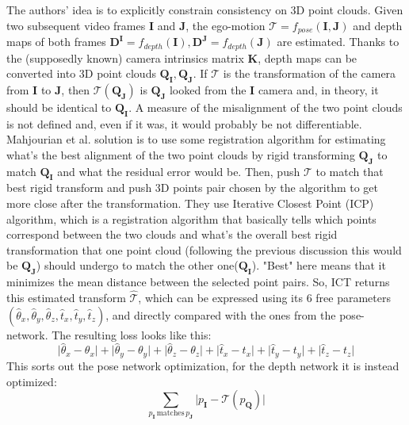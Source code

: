 The authors' idea is to explicitly constrain consistency on 3D point clouds.
Given two subsequent video frames $\mathbf{I}$ and $\mathbf{J}$, the ego-motion $\mathcal{T} = f_{pose}(\mathbf{I}, \mathbf{J})$ and depth maps of both frames $\mathbf{D}^{\mathbf{I}} = f_{depth}(\mathbf{I}), \mathbf{D}^{\mathbf{J}} = f_{depth}(\mathbf{J})$ are estimated.
Thanks to the (supposedly known) camera intrinsics matrix $\mathbf{K}$, depth maps can be converted into 3D point clouds $\mathbf{Q}_{\mathbf{I}}, \mathbf{Q}_{\mathbf{J}}$.
If $\mathcal{T}$ is the transformation of the camera from $\mathbf{I}$ to $\mathbf{J}$, then $\mathcal{T} ( \mathbf{Q}_{\mathbf{J}} )$ is $\mathbf{Q}_{\mathbf{J}}$ looked from the $\mathbf{I}$ camera and, in theory, it should be identical to $\mathbf{Q}_{\mathbf{I}}$.
A measure of the misalignment of the two point clouds is not defined and, even if it was, it would probably be not differentiable.
Mahjourian et al. solution is to use some registration algorithm for estimating what's the best alignment of the two point clouds by rigid transforming $\mathbf{Q}_{\mathbf{J}}$ to match $\mathbf{Q}_{\mathbf{I}}$ and what the residual error would be.
Then, push $\mathcal{T}$ to match that best rigid transform and push 3D points pair chosen by the algorithm to get more close after the transformation.
They use Iterative Closest Point (ICP) algorithm, which is a registration algorithm that basically tells which points correspond between the two clouds and what's the overall best rigid transformation that one point cloud (following the previous discussion this would be $\mathbf{Q}_{\mathbf{J}}$) should undergo to match the other one($\mathbf{Q}_{\mathbf{I}}$).
"Best" here means that it minimizes the mean distance between the selected point pairs.
So, ICT returns this estimated transform $\hat{\mathcal{T}}$, which can be expressed using its 6 free parameters $(\hat{\theta}_{x}, \hat{\theta}_{y}, \hat{\theta}_{z}, \hat{t}_{x}, \hat{t}_{y}, \hat{t}_{z})$, and directly compared with the ones from the pose-network.
The resulting loss looks like this:
\[
	\big| \hat{\theta}_{x} - \theta_{x} \big| +
	\big| \hat{\theta}_{y} - \theta_{y} \big| +
	\big| \hat{\theta}_{z} - \theta_{z} \big| +
	\big| \hat{t}_{x} - t_{x} \big| +
	\big| \hat{t}_{y} - t_{y} \big| +
	\big| \hat{t}_{z} - t_{z} \big|
\]
This sorts out the pose network optimization, for the depth network it is instead optimized:
\[
	\sum_{p_{\mathbf{I}} \, \text{matches} \, p_{\mathbf{J}}} \big| p_{\mathbf{I}} - \mathcal{T} (p_{\mathbf{Q}}) \big|
\]

